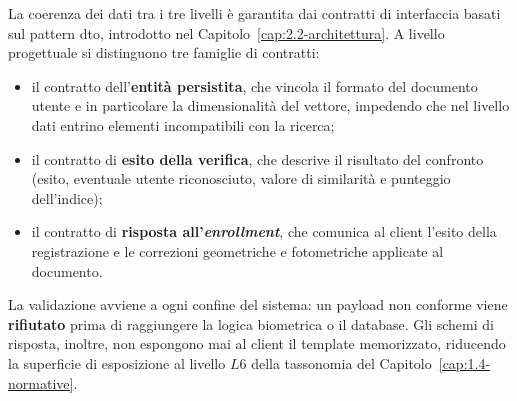 La coerenza dei dati tra i tre livelli è garantita dai contratti di interfaccia basati sul pattern \gls{dto}, introdotto nel Capitolo~\ref{cap:2.2-architettura}.
A livello progettuale si distinguono tre famiglie di contratti: 
\begin{itemize}
    \item il contratto dell'\textbf{entità persistita}, che vincola il formato del documento utente e in particolare la dimensionalità del vettore, impedendo che nel livello dati entrino elementi incompatibili con la ricerca;
    \item il contratto di \textbf{esito della verifica}, che descrive il risultato del confronto (esito, eventuale utente riconosciuto, valore di similarità e punteggio dell'indice);
    \item il contratto di \textbf{risposta all'\textit{enrollment}}, che comunica al client l'esito della registrazione e le correzioni geometriche e fotometriche applicate al documento.
\end{itemize}
La validazione avviene a ogni confine del sistema: un payload non conforme viene \textbf{rifiutato} prima di raggiungere la logica biometrica o il database.
Gli schemi di risposta, inoltre, non espongono mai al client il template memorizzato, riducendo la superficie di esposizione al livello $L6$ della tassonomia del Capitolo~\ref{cap:1.4-normative}.

